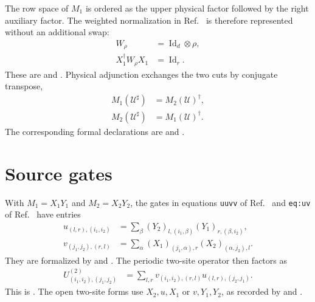 \documentclass{article}
\begin{document}
The row space of $M_1$ is ordered as the upper physical factor followed by the
right auxiliary factor. The weighted normalization in
Ref.~\cite{Cirac2017MPU} is therefore represented without an additional swap:
\begin{align}
    W_\rho
     & =\operatorname{Id}_d\otimes\rho,
    \label{eq:mpu_source_cut_orientation_weight} \\
    X_1^\dagger W_\rho X_1
     & =\operatorname{Id}_r.
    \label{eq:mpu_source_cut_orientation_weighted_isometry}
\end{align}
These are  and
. Physical adjunction exchanges
the two cuts by conjugate transpose,
\begin{align}
    M_1(\mathcal U^\sharp)
     & =M_2(\mathcal U)^\dagger,
    \label{eq:mpu_source_cut_orientation_adjoint_one} \\
    M_2(\mathcal U^\sharp)
     & =M_1(\mathcal U)^\dagger.
    \label{eq:mpu_source_cut_orientation_adjoint_two}
\end{align}
The corresponding formal declarations are
 and
.

\section{Source gates}

With $M_1=X_1Y_1$ and $M_2=X_2Y_2$, the gates in equations
\texttt{uuvv} of Ref.~\cite{Cirac2017MPU} and \texttt{eq:uv} of
Ref.~\cite{FrancoRubio2025MPUGauging} have entries
\begin{align}
    u_{(l,r),(i_1,i_2)}
     & =\sum_\beta
    (Y_2)_{l,(i_1,\beta)}(Y_1)_{r,(\beta,i_2)},
    \label{eq:mpu_source_cut_orientation_u} \\
    v_{(j_1,j_2),(r,l)}
     & =\sum_\alpha
    (X_1)_{(j_1,\alpha),r}(X_2)_{(\alpha,j_2),l}.
    \label{eq:mpu_source_cut_orientation_v}
\end{align}
They are formalized by  and
. The periodic two-site operator then
factors as
\begin{align}
    U^{(2)}_{(i_1,i_2),(j_1,j_2)}
     & =\sum_{l,r}
    v_{(i_1,i_2),(r,l)}u_{(l,r),(j_2,j_1)}.
    \label{eq:mpu_source_cut_orientation_two_site}
\end{align}
This is .
The open two-site forms use $X_2,u,X_1$ or $v,Y_1,Y_2$, as recorded by
 and
.
\end{document}

